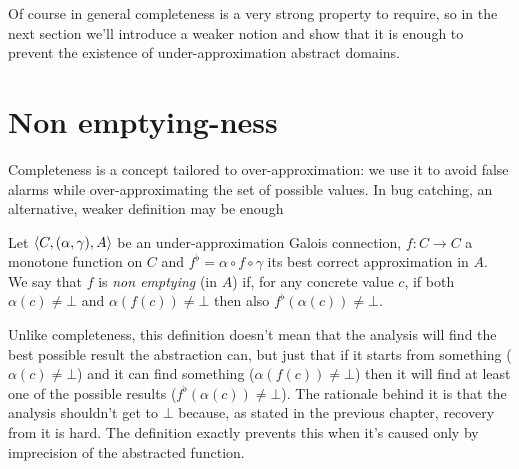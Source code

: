 Of course in general completeness is a very strong property to require, so in the next section we'll introduce a weaker notion and show that it is enough to prevent the existence of under-approximation abstract domains.

\section{Non emptying-ness}
Completeness is a concept tailored to over-approximation: we use it to avoid false alarms while over-approximating the set of possible values. In bug catching, an alternative, weaker definition may be enough
\begin{definition}\label{ch3:def:non-emptying}
	Let $\langle C, (\alpha, \gamma), A \rangle$ be an under-approximation Galois connection, $f : C \rightarrow C$ a monotone function on $C$ and $f^{\flat} = \alpha \circ f \circ \gamma$ its best correct approximation in $A$.
	We say that $f$ is \textit{non emptying} (in $A$) if, for any concrete value $c$, if both $\alpha(c) \neq \bot$ and $\alpha(f(c)) \neq \bot$ then also $f^{\flat}(\alpha(c)) \neq \bot$.
\end{definition}

Unlike completeness, this definition doesn't mean that the analysis will find the best possible result the abstraction can, but just that if it starts from something ($\alpha(c) \neq \bot$) and it can find something ($\alpha(f(c)) \neq \bot$) then it will find at least one of the possible results ($f^{\flat}(\alpha(c)) \neq \bot$).
The rationale behind it is that the analysis shouldn't get to $\bot$ because, as stated in the previous chapter, recovery from it is hard. The definition exactly prevents this when it's caused only by imprecision of the abstracted function.

